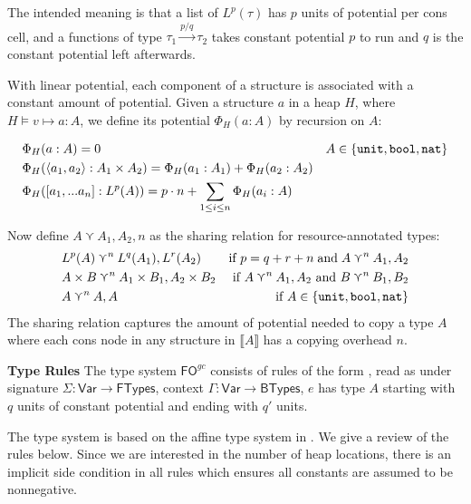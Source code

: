 \documentclass{easychair}
\newcommand{\ms}[1]{\ensuremath{\mathsf{#1}}}
\newcommand{\irl}[1]{\mathtt{#1}}
\newcounter{rule}
\newcommand{\fogc}{\ms{FO}^{gc}}
\theoremstyle{definition}
\begin{document}
The intended meaning is that a list of $L^p(\tau)$ has $p$ units of potential per 
cons cell, and a functions of type $\tau_1 \xrightarrow{p/q} \tau_2$ takes constant potential 
$p$ to run and $q$ is the constant potential left afterwards.

With linear potential, each component of a structure is associated with a constant amount of 
potential.  Given a structure $a$ in a heap $H$, where  $H \vDash v \mapsto a : A$, we define 
its potential $\Phi_H(a : A)$ by recursion on $A$: 

\begin{align*}
&\Phi_H(a : A) = 0 &A \in \{\unittycst, \booltyabt, \irl{nat}\}\\
&\Phi_H(\pairexcst{a_1}{a_2} : \prodtycst{A_1}{A_2}) = \Phi_H(a_1 : A_1) + \Phi_H(a_2 : A_2)\\
&\Phi_H([a_1,...a_n] : L^p(A)) = p\cdot n + \sum_{1 \le i \le n} \Phi_H(a_i : A)  
\end{align*}

Now define $A \curlyvee A_1,A_2,n$ as the sharing relation for resource-annotated types:
\begin{align*}
	&L^p(A) \curlyvee^n L^q(A_1),L^r(A_2) & \text{if } p = q + r + n \;\text{and}\; 
			A \curlyvee^n A_1,A_2\\
	&\prodtycst{A}{B} \curlyvee^n \prodtycst{A_1}{B_1}, \prodtycst{A_2}{B_2}
		&\text{ if } A \curlyvee^n A_1,A_2 \text{ and } B \curlyvee^n B_1,B_2\\
	&A \curlyvee^n  A,A& \text{ if } A \in \{\unittycst, \booltycst, \irl{nat}\}\\
\end{align*}
The sharing relation captures the amount of potential needed to copy a type $A$ where each 
cons node in any structure in $\llbracket A \rrbracket$ has a copying overhead $n$.

\textbf{Type Rules}
\label{sect:typing}
The type system $\fogc$ consists of rules of the form , 
read as under signature $\Sigma : \ms{Var} \to \ms{FTypes}$, 
context $\Gamma : \ms{Var} \to \ms{BTypes}$, $e$ has type $A$ starting with $q$ units of 
constant potential and ending with $q'$ units.

The type system is based on the affine type system in \cite{HoffmannW15}. 
We give a review of the rules below.
Since we are interested in the number of heap locations, 
there is an implicit side condition in all rules
which ensures all constants are assumed to be nonnegative.
\end{document}
